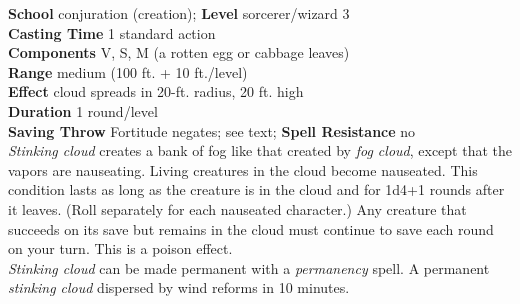 \textbf{School} conjuration (creation); \textbf{Level} sorcerer/wizard 3\\
\textbf{Casting Time} 1 standard action\\
\textbf{Components} V, S, M (a rotten egg or cabbage leaves)\\
\textbf{Range }medium (100 ft. + 10 ft./level)\\
\textbf{Effect} cloud spreads in 20-ft. radius, 20 ft. high\\
\textbf{Duration} 1 round/level\\
\textbf{Saving Throw} Fortitude negates; see text; \textbf{Spell Resistance} no\\
\textit{Stinking cloud }creates a bank of fog like that created by \textit{fog cloud}, except that the vapors are nauseating. Living creatures in the cloud become nauseated. This condition lasts as long as the creature is in the cloud and for 1d4+1 rounds after it leaves. (Roll separately for each nauseated character.) Any creature that succeeds on its save but remains in the cloud must continue to save each round on your turn. This is a poison effect.\\
\textit{Stinking cloud }can be made permanent with a \textit{permanency }spell. A permanent \textit{stinking cloud }dispersed by wind reforms in 10 minutes.\\
